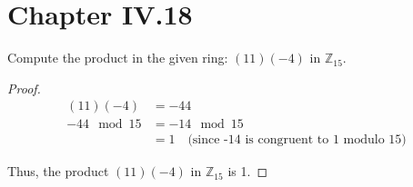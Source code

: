 \documentclass[12pt]{amsart}
\theoremstyle{definition}
\numberwithin{equation}{section}
\theoremstyle{plain}
\newcommand{\Z}{\mathbb{Z}}
\begin{document}
\section*{Chapter IV.18}
\begin{exercise}{3}
    Compute the product in the given ring: $(11)(-4)$ in $\Z_15$.
    \begin{proof}
    \begin{align*}
    (11)(-4) &= -44 \\
    -44 \mod 15 &= -14 \mod 15 \\
    &= 1 \quad \text{(since -14 is congruent to 1 modulo 15)}
    \end{align*}
    
    Thus, the product \( (11)(-4) \) in \(\Z_{15} \) is 1.
    \end{proof}
    
\end{exercise}
\vspace*{20pt}
\end{document}
